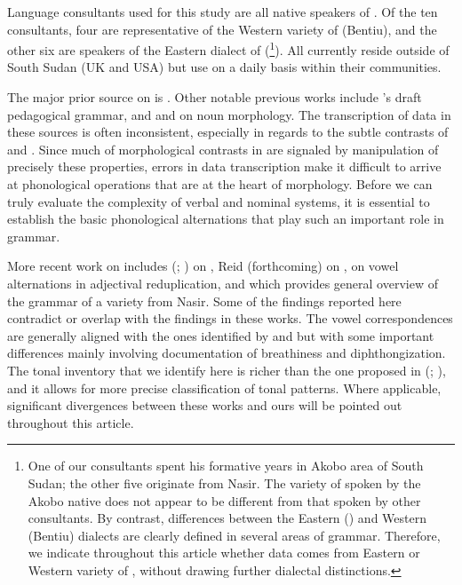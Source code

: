 \documentclass[output=paper,newtxmath,modfonts,nonflat]{langsci/langscibook}
\begin{document}
Language consultants used for this study are all native speakers of . Of the ten consultants, four are representative of the Western variety of  (Bentiu), and the other six are speakers of the Eastern dialect of  (\footnote{One of our   consultants spent his formative years in Akobo area of South Sudan; the other five originate from Nasir. The variety of  spoken by the Akobo native does not appear to be different from that spoken by other   consultants. By contrast, differences between the Eastern () and Western (Bentiu) dialects are clearly defined in several areas of grammar. Therefore, we indicate throughout this article whether data comes from Eastern or Western variety of , without drawing further dialectal distinctions.}). All currently reside outside of South Sudan (UK and USA) but use  on a daily basis within their communities. 

The major prior source on  is \citet{Crazzolara1933}. Other notable previous works include \citet{Vandevortnd}'s draft pedagogical grammar, and \citet{Frank1999} and \citet{Storch2005} on noun morphology. The transcription of data in these sources is often inconsistent, especially in regards to the subtle contrasts of  and . Since much of morphological contrasts in  are signaled by manipulation of precisely these properties, errors in data transcription make it difficult to arrive at phonological operations that are at the heart of  morphology. Before we can truly evaluate the complexity of  verbal and nominal systems, it is essential to establish the basic phonological alternations that play such an important role in  grammar.

More recent work on  includes
\citeauthor{gjersøe2016} (\citeyear{gjersøe2016}; \citeyear{gjersøe2017}) on , Reid (forthcoming) on , \citet{Faust2017} on vowel alternations in adjectival reduplication, and \citet{faust2015} which provides general overview of the grammar of a  variety from Nasir. Some of the findings reported here contradict or overlap with the findings in these works. The vowel correspondences are generally aligned with the ones identified by \citet{Faust2017} and \citet{faust2015} but with some important differences mainly involving documentation of breathiness and diphthongization. The tonal inventory that we identify here is richer than the one proposed in \citeauthor{gjersøe2016} (\citeyear{gjersøe2016}; \citeyear{gjersøe2017}), and it allows for more precise classification of tonal patterns. Where applicable, significant divergences between these works and ours will be pointed out throughout this article.
\end{document}
